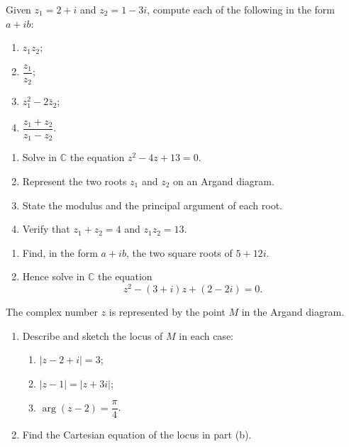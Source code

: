 \documentclass[11pt]{article}
\newcounter{popsec}
\newcounter{popsub}
\newcommand{\courssub}[1]{%
  \stepcounter{popsub}%
  \par\vspace{9pt}\noindent{\popxbold\fontsize{11.5}{13}\selectfont\color{popink}{\color{poporange}\thepopsec.\thepopsub}\hspace{6pt}#1}\par\nopagebreak\vspace{4pt}
}
\begin{document}
\courssub{I practise}

\begin{exercice}
Given $z_1 = 2 + i$ and $z_2 = 1 - 3i$, compute each of the following in the form $a + ib$:
\begin{enumerate}
\item $z_1 z_2$;
\item $\dfrac{z_1}{z_2}$;
\item $z_1^2 - 2\bar{z}_2$;
\item $\dfrac{z_1 + z_2}{z_1 - z_2}$.
\end{enumerate}
\end{exercice}

\begin{exercice}
\begin{enumerate}
\item Solve in $\mathbb{C}$ the equation $z^2 - 4z + 13 = 0$.
\item Represent the two roots $z_1$ and $z_2$ on an Argand diagram.
\item State the modulus and the principal argument of each root.
\item Verify that $z_1 + z_2 = 4$ and $z_1 z_2 = 13$.
\end{enumerate}
\end{exercice}

\begin{exercice}
\begin{enumerate}
\item Find, in the form $a + ib$, the two square roots of $5 + 12i$.
\item Hence solve in $\mathbb{C}$ the equation
\[ z^2 - (3 + i)z + (2 - 2i) = 0. \]
\end{enumerate}
\end{exercice}

\begin{exercice}
The complex number $z$ is represented by the point $M$ in the Argand diagram.
\begin{enumerate}
\item Describe and sketch the locus of $M$ in each case:
\begin{enumerate}
\item $|z - 2 + i| = 3$;
\item $|z - 1| = |z + 3i|$;
\item $\arg(z - 2) = \dfrac{\pi}{4}$.
\end{enumerate}
\item Find the Cartesian equation of the locus in part (b).
\end{enumerate}
\end{exercice}
\end{document}

